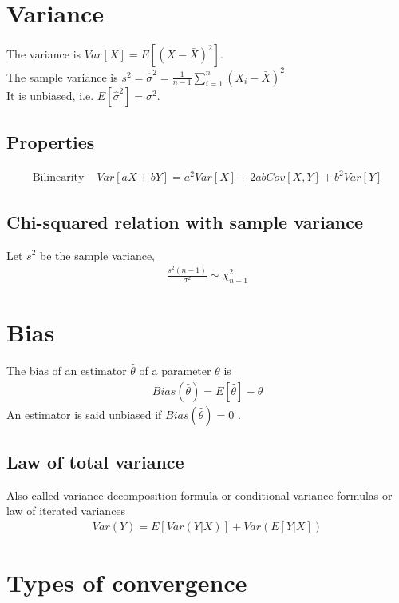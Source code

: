 \documentclass[../main.tex]{subfiles}
\begin{document}
\section{Variance}
The variance is $Var[X] = E[(X - \bar{X})^2]$. \\
The sample variance is $s^2 = \hat{\sigma}^2 = \frac{1}{n-1} \sum_{i=1}^{n}{(X_i - \bar{X})^2}$ \\
It is unbiased, i.e. $E[\hat{\sigma}^2] = \sigma^2$.

\subsection{Properties}
\begin{align*}
    \text{Bilinearity }&Var[aX + bY] = a^2Var[X] + 2abCov[X, Y] + b^2 Var[Y]
\end{align*}

\subsection{Chi-squared relation with sample variance}
Let $s^2$ be the sample variance,
\begin{align*}
    \frac{s^2(n-1)}{\sigma^2} \sim \chi_{n-1}^2
\end{align*}

\section{Bias}
The bias of an estimator $\hat{\theta}$ of a parameter $\theta$ is
\begin{align*}
    Bias(\hat{\theta}) = E[\hat{\theta}] - \theta
\end{align*}
An estimator is said unbiased if $Bias(\hat{\theta}) = 0$ .




\subsection{Law of total variance}
Also called variance decomposition formula or conditional variance formulas or law of iterated variances
\begin{align*}
    Var(Y) = E[Var(Y | X)] + Var(E[Y | X])
\end{align*}

\section{Types of convergence}
\end{document}
